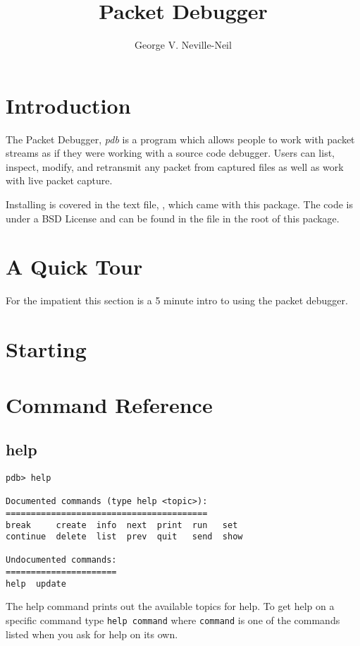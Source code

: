 \documentclass[11pt]{article}
\title{Packet Debugger}
\author{George V. Neville-Neil}
\begin{document}
\maketitle

\section{Introduction}

The Packet Debugger, \emph{pdb} is a program which allows people to
work with packet streams as if they were working with a source code
debugger. Users can list, inspect, modify, and retransmit any packet
from captured files as well as work with live packet capture.

Installing  is covered in the text file,
, which came with this package.  The code is under
a BSD License and can be found in the file  in the
root of this package.

\section{A Quick Tour}

For the impatient this section is a 5 minute intro to using the packet
debugger.

\section{Starting }

\section{Command Reference}

\subsection{help}

\begin{verbatim}
pdb> help

Documented commands (type help <topic>):
========================================
break     create  info  next  print  run   set 
continue  delete  list  prev  quit   send  show

Undocumented commands:
======================
help  update
\end{verbatim}

The help command prints out the available topics for help.  To get
help on a specific command type \verb|help command| where
\verb|command| is one of the commands listed when you ask for help on
its own.
\end{document}
